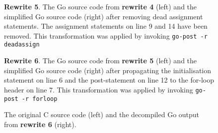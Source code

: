 \begin{figure}[htbp]
	\centering
	\begin{subfigure}[t]{0.45\textwidth}
		
	\end{subfigure}
	\qquad
	\begin{subfigure}[t]{0.45\textwidth}
		
	\end{subfigure}
	\caption{\textbf{Rewrite 5}. The Go source code from \textbf{rewrite 4} (left) and the simplified Go source code (right) after removing dead assignment statements. The assignment statements on line 9 and 14 have been removed. This transformation was applied by invoking \texttt{go-post -r deadassign}}
	\label{fig:rewrite_5}
\end{figure}

\begin{figure}[htbp]
	\centering
	\begin{subfigure}[t]{0.45\textwidth}
		
	\end{subfigure}
	\qquad
	\begin{subfigure}[t]{0.45\textwidth}
		
	\end{subfigure}
	\caption{\textbf{Rewrite 6}. The Go source code from \textbf{rewrite 5} (left) and the simplified Go source code (right) after propagating the initialisation statement on line 6 and the post-statement on line 12 to the for-loop header on line 7. This transformation was applied by invoking \texttt{go-post -r forloop}}
	\label{fig:rewrite_6}
\end{figure}

\begin{figure}[htbp]
	\centering
	\begin{subfigure}[t]{0.49\textwidth}
		
	\end{subfigure}
	\qquad
	\begin{subfigure}[t]{0.45\textwidth}
		
	\end{subfigure}
	\caption{The original C source code (left) and the decompiled Go output from \textbf{rewrite 6} (right).}
	\label{fig:example1_comparison}
\end{figure}
